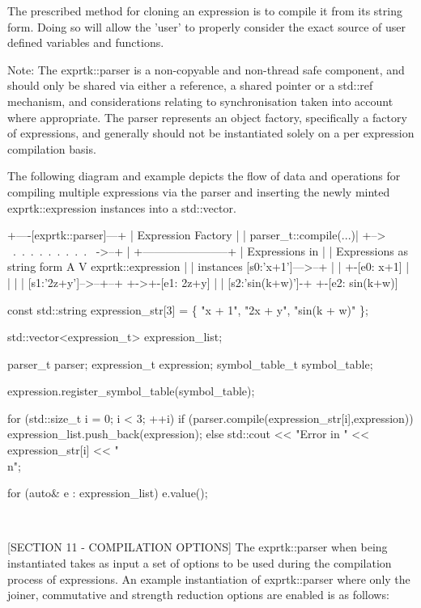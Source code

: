 The prescribed method for cloning an expression is to compile it  from
its string  form. Doing so will allow the 'user' to  properly consider
the exact source of user defined variables and functions.

Note:  The  exprtk::parser  is  a  non-copyable  and  non-thread  safe
component, and should only be shared via either a reference, a  shared
pointer  or  a  std::ref  mechanism,  and  considerations  relating to
synchronisation  taken  into  account  where  appropriate.  The parser
represents an object factory,  specifically a factory of  expressions,
and generally should  not be instantiated  solely on a  per expression
compilation basis.

The  following  diagram  and  example depicts  the  flow  of  data and
operations  for  compiling  multiple expressions  via  the  parser and
inserting  the  newly  minted  exprtk::expression  instances  into   a
std::vector.

+----[exprtk::parser]---+
|   Expression Factory  |
| parser\_t::compile(...)|
+--> ~.~.~.~.~.~.~.~.~.~ ->--+
| +-----------------------+  |
Expressions in     |                            |  Expressions as
string form        A                            V  exprtk::expression
|                            |  instances
[s0:'x+1']--->--+  |                            |  +-[e0: x+1]
|  |                            |  |
[s1:'2z+y']-->--+--+                            +->+-[e1: 2z+y]
|                                  |
[s2:'sin(k+w)']-+                                  +-[e2: sin(k+w)]


const std::string expression\_str[3]
= \{ "x + 1", "2x + y", "sin(k + w)" \};

std::vector<expression\_t> expression\_list;

parser\_t             parser;
expression\_t     expression;
symbol\_table\_t symbol\_table;

expression.register\_symbol\_table(symbol\_table);

for (std::size\_t i = 0; i < 3; ++i)
{
if (parser.compile(expression\_str[i],expression))
{
	expression\_list.push\_back(expression);
}
else
std::cout << "Error in " << expression\_str[i] << "\\n";
}

for (auto\& e : expression\_list)
{
e.value();
}

~~~~~~~~~~~~~~~~~~~~~~~~~~~~~~~~~~~~~~~~~~~~~~~~~~~~~~~~~~

[SECTION 11 - COMPILATION OPTIONS]
The exprtk::parser  when being  instantiated takes  as input  a set of
options  to be  used during  the compilation  process of  expressions.
An  example instantiation  of exprtk::parser  where only  the  joiner,
commutative and strength reduction options are enabled is as  follows:

